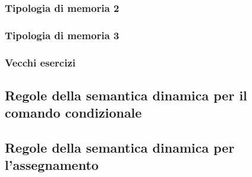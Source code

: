 \documentclass[a4paper]{article}
\begin{document}
	\subsubsection{Tipologia di memoria 2}
	
	\subsubsection{Tipologia di memoria 3}
	
	\subsubsection{Vecchi esercizi}
	
	\subsection{Regole della semantica dinamica per il comando condizionale}
	
	
	\subsection{Regole della semantica dinamica per l'assegnamento}
	
\end{document}

